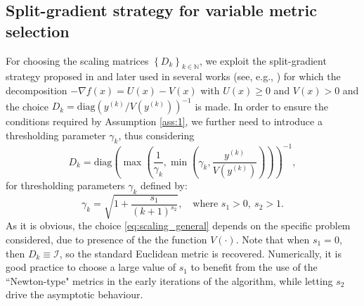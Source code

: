 \documentclass[conference]{IEEEtran}
\begin{document}


\subsection{Split-gradient strategy for variable metric selection}

For choosing the scaling matrices $\left\{D_k\right\}_{k\in\mathbb{N}}$, we exploit the split-gradient strategy proposed in \cite{Lanteri-etal-2001} and later used in several works (see, e.g., \cite{Bonettini-Loris-Porta-Prato-2015,Bonettini2018a}) for which the decomposition $-\nabla f(x) = U(x) - V(x)$ with $U(x)\geq 0$ and $V(x)>0$ and the choice $D_k=\text{diag}\left( y^{(k)}/V(y^{(k)}) \right)^{-1}$ is made.  %
In order to ensure the conditions required by Assumption \ref{ass:1}, we further need to introduce a thresholding parameter $\gamma_k$, thus considering
\begin{equation}  \label{eq:scaling_general}
    D_k = \text{diag}\left(\max\left(\frac{1}{\gamma_k},\min\left(\gamma_k,  \frac{y^{(k)}}{V(y^{(k)})} \right)\right)\right)^{-1},
\end{equation}
for thresholding parameters $\gamma_k$ defined by:
\begin{equation} \label{eq:gamma_k_pb1}
    \gamma_k = \sqrt{1+\frac{s_1}{(k+1)^{s_2}}},\quad \text{where }s_1 >0, \ s_2>1.
\end{equation}
As it is obvious, the choice \eqref{eq:scaling_general} depends on the specific problem considered, due to presence of the the function $V(\cdot)$. Note that when $s_1=0$, then $D_k\equiv\mathcal{I}$, so the standard Euclidean metric is recovered. Numerically, it is good practice to choose a large value of $s_1$ to benefit from the use of the ``Newton-type"  metrics in the early iterations of the algorithm, while letting $s_2$ drive the asymptotic behaviour.
\end{document}
